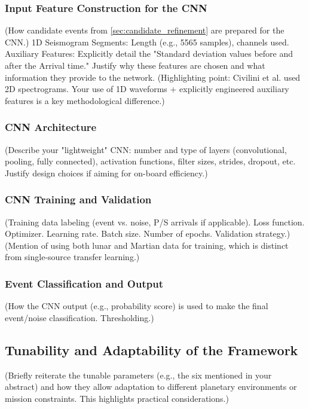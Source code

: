 \documentclass[conference]{IEEEtran}
\begin{document}
    \subsubsection{Input Feature Construction for the CNN}
        (How candidate events from \ref{sec:candidate_refinement} are prepared for the CNN.) 1D Seismogram Segments:
        Length (e.g., 5565 samples), channels used. Auxiliary Features: Explicitly detail the "Standard deviation values
        before and after the Arrival time." Justify why these features are chosen and what information they provide to
        the network. (Highlighting point: Civilini et al. used 2D spectrograms. Your use of 1D waveforms + explicitly
        engineered auxiliary features is a key methodological difference.)
        
        \subsubsection{CNN Architecture}
        (Describe your "lightweight" CNN: number and type of layers (convolutional, pooling, fully connected),
        activation functions, filter sizes, strides, dropout, etc. Justify design choices if aiming for on-board
        efficiency.)
        
        \subsubsection{CNN Training and Validation}
        (Training data labeling (event vs. noise, P/S arrivals if applicable). Loss function. Optimizer. Learning rate.
        Batch size. Number of epochs. Validation strategy.) (Mention of using both lunar and Martian data for training,
        which is distinct from single-source transfer learning.)
        
        \subsubsection{Event Classification and Output}
        (How the CNN output (e.g., probability score) is used to make the final event/noise classification.
        Thresholding.)
        
        \subsection{Tunability and Adaptability of the Framework}
        (Briefly reiterate the tunable parameters (e.g., the six mentioned in your abstract) and how they allow
        adaptation to different planetary environments or mission constraints. This highlights practical
        considerations.)
        
\end{document}
